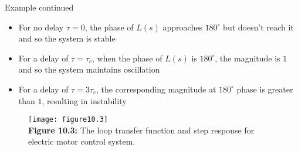 \documentclass{beamer-control}
\begin{document}
\begin{frame}{Example continued}
\begin{itemize}
\item For no delay $\tau=0$, the phase of $L(s)$ approaches $180^\circ$ but doesn't reach it and so the system is stable
\item For a delay of $\tau=\tau_c$, when the phase of $L(s)$ is $180^\circ$, the magnitude is $1$ and so the system maintains oscillation
\item For a delay of $\tau=3\tau_c$, the corresponding magnitude at $180^\circ$ phase is greater than $1$, resulting in instability
\end{itemize}
\begin{figure}
\centering
\texttt{[image: figure10.3]}
\\
\textbf{Figure 10.3:} The loop transfer function and step response for electric motor control system.
\end{figure}

\end{frame}


\SUMMARYFRAME
\FINALE
\end{document}
